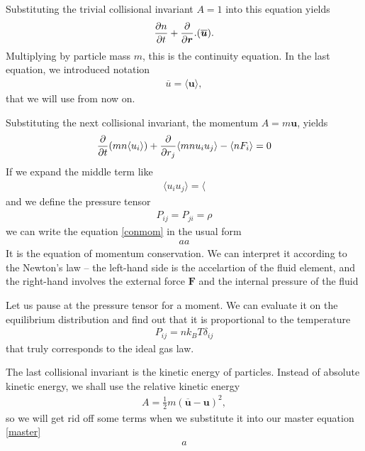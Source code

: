 Substituting the trivial collisional invariant $A=1$ into this equation yields
\begin{align*}
\frac{\partial n}{\partial t} + \frac{\partial}{\partial \bm{r}}.(\overline{\bm{u}}). 
\end{align*}
Multiplying by particle mass $m$, this is the continuity equation.
In the last equation, we introduced notation 
\begin{align*}
\overline{{u}} = \langle \bm{u} \rangle,
\end{align*}
that we will use from now on.

Substituting the next collisional invariant, the momentum $A=m\bm{u}$, yields
\begin{align} \label{conmom}
\frac{\partial}{\partial t} (mn\langle u_i \rangle) + \frac{\partial}{\partial r_j}\langle mn u_i u_j \rangle - \langle n F_i \rangle = 0
\end{align}
If we expand the middle term like
\begin{align*}
\langle u_i u_j \rangle = \langle
\end{align*}
and we define the pressure tensor
\begin{align*}
P_{ij} = P_{ji} = \rho
\end{align*}
we can write the equation \ref{conmom} in the usual form
\begin{align*}
aa
\end{align*}
It is the equation of momentum conservation. We can interpret it according to the Newton's law -- the left-hand side is the accelartion of the fluid element, and the right-hand involves the external force $\bm{F}$ and the internal pressure of the fluid

Let us pause at the pressure tensor for a moment. We can evaluate it on the equilibrium distribution and find out that it is proportional to the temperature
\begin{align*}
P_{ij} = n k_B T \delta_{ij}
\end{align*} 
that truly corresponds to the ideal gas law.

\bigskip

The last collisional invariant is the kinetic energy of particles.
Instead of absolute kinetic energy, we shall use the relative kinetic energy
\begin{align*}
A  = \frac{1}{2} m (\overline{\bm{u}} - \bm{u})^2,
\end{align*}
so we will get rid off some terms when we substitute it into our master equation \ref{master}
\begin{align} \label{cone}
a
\end{align}

